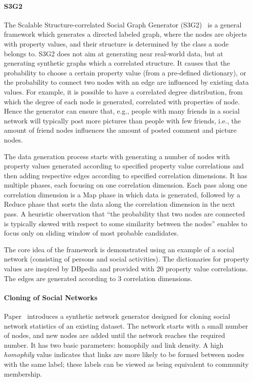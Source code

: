 \paragraph{S3G2} The Scalable Structure-correlated Social Graph Generator (S3G2)~\cite{Pham2013} is a general framework which  generates a directed labeled graph, where the nodes are objects with property values, and their structure is determined by the class a node belongs to. S3G2 does not aim at generating near real-world data, but at generating synthetic graphs which a correlated structure. It causes that the probability to choose a certain property value (from a pre-defined dictionary), or the probability to connect two nodes with an edge are influenced by existing data values. For example, it is possible to have a correlated degree distribution, from which the degree of each node is generated, correlated with properties of node. Hence the generator can ensure that, e.g., people with many friends in a social network will typically post more pictures than people with few friends, i.e., the amount of friend nodes influences the amount of posted comment and picture nodes.

The data generation process starts with generating a number of nodes with property values generated according to specified property value correlations and then adding respective edges according to specified correlation dimensions. It has multiple phases, each focusing on one correlation dimension. Each pass along one correlation dimension is a Map phase in which data is generated, followed by a Reduce phase that sorts the data along the correlation dimension in the next pass. A heuristic observation that ``the probability that two nodes are connected is typically skewed with respect to some similarity between the nodes'' enables to focus only on sliding window of most probable candidates.

The core idea of the framework is demonstrated using an example of a social network (consisting of persons and social activities).  The dictionaries for property values are inspired by DBpedia and provided with 20 property value correlations. The edges are generated according to 3 correlation dimensions.


\paragraph{Cloning of Social Networks} Paper~\cite{Sukthankar-SocialInfo2014} introduces a synthetic network generator designed for cloning social network statistics of an existing dataset. The network starts with a small number of nodes, and new nodes are added until the network reaches the required number. It has two basic parameters: homophily and link density. A high \emph{homophily} value indicates that links are more likely to be formed between nodes with the same label; these labels can be viewed as being equivalent to community membership.

